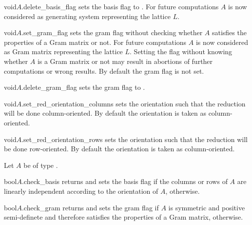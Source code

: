 \begin{fcode}{void}{$A$.delete_basis_flag}{}
  sets the basis flag to \FALSE.  For future computations $A$ is now considered as generating
  system representing the lattice $L$.
\end{fcode}

\begin{fcode}{void}{$A$.set_gram_flag}{}
  sets the gram flag without checking whether $A$ satisfies the properties of a Gram matrix or
  not.  For future computations $A$ is now considered as Gram matrix representing the lattice
  $L$.  Setting the flag without knowing whether $A$ is a Gram matrix or not may result in
  abortions of further computations or wrong results.  By default the gram flag is not set.
\end{fcode}

\begin{fcode}{void}{$A$.delete_gram_flag}{}
  sets the gram flag to \FALSE.
\end{fcode}

\begin{fcode}{void}{$A$.set_red_orientation_columns}{}
  sets the orientation such that the reduction will be done column-oriented.  By default the
  orientation is taken as column-oriented.
\end{fcode}

\begin{fcode}{void}{$A$.set_red_orientation_rows}{}
  sets the orientation such that the reduction will be done row-oriented.  By default the
  orientation is taken as column-oriented.
\end{fcode}



\BASIC

Let $A$ be of type .

\begin{fcode}{bool}{$A$.check_basis}{}
  returns \TRUE and sets the basis flag if the columns or rows of $A$ are linearly independent
  according to the orientation of $A$, \FALSE otherwise.
\end{fcode}

\begin{fcode}{bool}{$A$.check_gram}{}
  returns \TRUE and sets the gram flag if $A$ is symmetric and positive semi-definete and
  therefore satisfies the properties of a Gram matrix, \FALSE otherwise.
\end{fcode}


